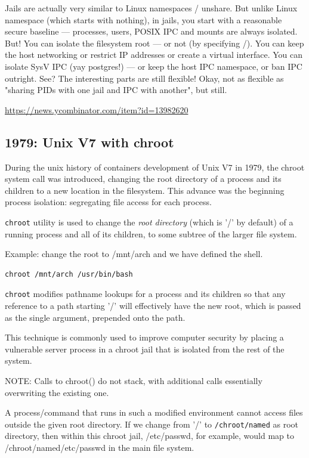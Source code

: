 Jails are actually very similar to Linux namespaces / unshare. But unlike Linux
namespace (which starts with nothing), in jails, you start with a reasonable
secure baseline — processes, users, POSIX IPC and mounts are always isolated.
But! You can isolate the filesystem root — or not (by specifying /). You can
keep the host networking or restrict IP addresses or create a virtual interface.
You can isolate SysV IPC (yay postgres!) — or keep the host IPC namespace, or
ban IPC outright. See? The interesting parts are still flexible! Okay, not as
flexible as "sharing PIDs with one jail and IPC with another", but still.

\url{https://news.ycombinator.com/item?id=13982620}


\subsection{1979: Unix V7 with chroot}
\label{sec:chroot}

During the unix history of containers development of Unix V7 in 1979, the chroot
system call was introduced, changing the root directory of a process and its
children to a new location in the filesystem. This advance was the beginning
process isolation: segregating file access for each process.


\verb!chroot! utility is used to change the {\it root directory} (which is '/'
by default) of a running process and all of its children, to some subtree of the larger file system.

Example: change the root to /mnt/arch and we have defined the shell.
\begin{verbatim}
chroot /mnt/arch /usr/bin/bash
\end{verbatim}

\verb!chroot! modifies pathname lookups for a process and its children so that
any reference to a path starting '/' will effectively have the new root, which
is passed as the single argument, prepended onto the path.


This technique is commonly used to improve computer security by placing a
vulnerable server process in a chroot jail that is isolated from the rest of the
system.

NOTE: Calls to chroot() do not stack, with additional calls essentially
overwriting the existing one.


A process/command that runs in such a modified environment cannot access files
outside the given root directory. If we change from '/' to \verb!/chroot/named! as
root directory, then within this chroot jail, /etc/passwd, for example, would
map to /chroot/named/etc/passwd in the main file system.

